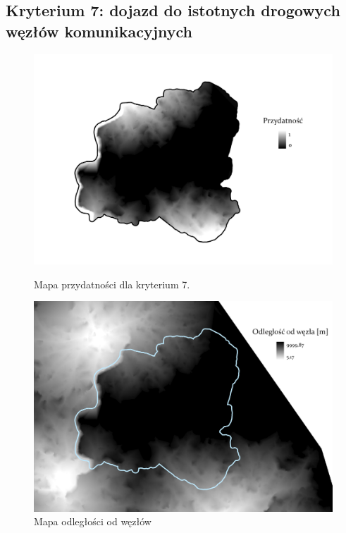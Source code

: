 \documentclass{article}
\begin{document}
\subsection{Kryterium 7: dojazd do istotnych drogowych węzłów komunikacyjnych}

\begin{figure}[H]
    \begin{minipage}[t]{0.48\textwidth}
        \centering
        \includegraphics[width=\linewidth]{img/plesna-kryterium7-layout.jpg}
        \caption{Mapa przydatności dla kryterium 7.}
        \label{fig:kryterium7-layout}
    \end{minipage}
    \hfill
    \begin{minipage}[t]{0.48\textwidth}
        \centering
        \includegraphics[width=\linewidth]{img/plesna-kryterium7-wezly.jpg}
        \caption{Mapa odległości od węzłów}
        \label{fig:kryterium7-wezly}
    \end{minipage}
\end{figure}
\end{document}
